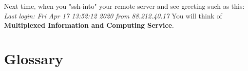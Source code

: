 Next time, when you "ssh-into" your remote server and see greeting such as this: \newline
\textit{Last login: Fri Apr 17 13:52:12 2020 from 88.212.40.17} \newline
You will think of \textbf{Multiplexed Information and Computing Service}.




\section{Glossary}

